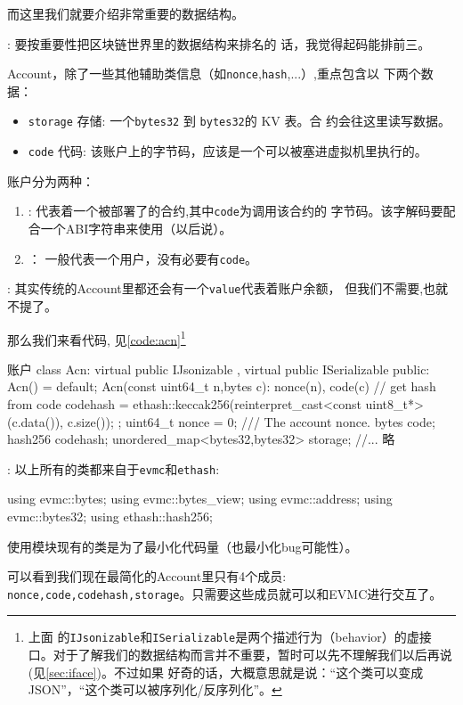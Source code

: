 而这里我们就要介绍非常重要的数据结构。
\begin{tcolorbox}
   : 要按重要性把区块链世界里的数据结构来排名的
  话，我觉得起码能排前三。
\end{tcolorbox}
Account，除了一些其他辅助类信息（如\texttt{nonce},\texttt{hash},...）,重点包含以
下两个数据：
\begin{itemize}
\item \texttt{storage} 存储: 一个\texttt{bytes32} 到 \texttt{bytes32}的 KV 表。合
  约会往这里读写数据。
\item \texttt{code} 代码: 该账户上的字节码，应该是一个可以被塞进虚拟机里执行的。
\end{itemize}
账户分为两种：
\begin{enumerate}
\item {} : 代表着一个被部署了的合约,其中\texttt{code}为调用该合约的
  字节码。该字解码要配合一个ABI字符串来使用（以后说）。
\item  {}： 一般代表一个用户，没有必要有\texttt{code}。
\end{enumerate}

\begin{tcolorbox}
   : 其实传统的Account里都还会有一个\texttt{value}代表着账户余额，
  但我们不需要,也就不提了。
\end{tcolorbox}

那么我们来看代码, 见\cref{code:acn}\footnote{上面
  的\texttt{IJsonizable}和\texttt{ISerializable}是两个描述行为（behavior）的虚接
  口。对于了解我们的数据结构而言并不重要，暂时可以先不理解我们以后再说(见\cref{sec:iface})。不过如果
  好奇的话，大概意思就是说：“这个类可以变成JSON”，“这个类可以被序列化/反序列化”。}

\begin{numberedc}{账户}{\label{code:acn}}
class Acn: virtual public IJsonizable
         , virtual public ISerializable{
public:
  Acn() = default;
  Acn(const uint64_t n,bytes c): nonce(n), code(c){
    // get hash from code
    codehash = ethash::keccak256(reinterpret_cast<const uint8_t*>(c.data()),
                                 c.size());
  };
  uint64_t nonce = 0; /// The account nonce.
  bytes code;
  hash256 codehash;
  unordered_map<bytes32,bytes32> storage;
  //... 略
}
\end{numberedc}

\begin{tcolorbox}
   : 以上所有的类都来自于\texttt{evmc}和\texttt{ethash}:
  \begin{simplec}
    using evmc::bytes;
    using evmc::bytes_view;
    using evmc::address;
    using evmc::bytes32;
    using ethash::hash256;
  \end{simplec}
  使用模块现有的类是为了最小化代码量（也最小化bug可能性）。
\end{tcolorbox}
可以看到我们现在最简化的Account里只有4个成员:
\texttt{nonce,code,codehash,storage}。只需要这些成员就可以和EVMC进行交互了。

